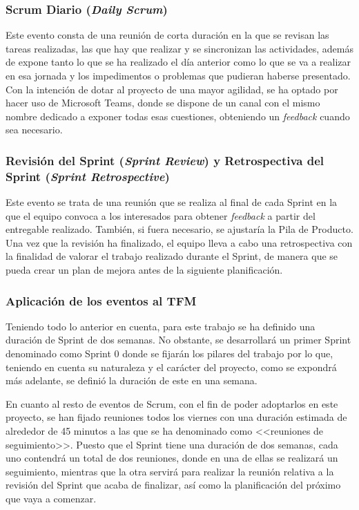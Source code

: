 \subsubsection{Scrum Diario (\textit{Daily Scrum})}
Este evento consta de una reunión de corta duración en la que se revisan las tareas realizadas, las que hay que realizar y se sincronizan las actividades, además de expone tanto lo que se ha realizado el día anterior como lo que se va a realizar en esa jornada y los impedimentos o problemas que pudieran haberse presentado. Con la intención de dotar al proyecto de una mayor agilidad, se ha optado por hacer uso de Microsoft Teams, donde se dispone de un canal con el mismo nombre dedicado a exponer todas esas cuestiones, obteniendo un \textit{feedback} cuando sea necesario.

\subsubsection{Revisión del Sprint (\textit{Sprint Review}) y Retrospectiva del Sprint (\textit{Sprint Retrospective})}
Este evento se trata de una reunión que se realiza al final de cada Sprint en la que el equipo convoca a los interesados para obtener \textit{feedback} a partir del entregable realizado. También, si fuera necesario, se ajustaría la Pila de Producto. Una vez que la revisión ha finalizado, el equipo lleva a cabo una retrospectiva con la finalidad de valorar el trabajo realizado durante el Sprint, de manera que se pueda crear un plan de mejora antes de la siguiente planificación.

\clearpage

\subsubsection{Aplicación de los eventos al \acs{TFM}}
Teniendo todo lo anterior en cuenta, para este trabajo se ha definido una duración de Sprint de dos semanas. No obstante, se desarrollará un primer Sprint denominado como Sprint 0 donde se fijarán los pilares del trabajo por lo que, teniendo en cuenta su naturaleza y el carácter del proyecto, como se expondrá más adelante, se definió la duración de este en una semana.

En cuanto al resto de eventos de Scrum, con el fin de poder adoptarlos en este proyecto, se han fijado reuniones todos los viernes con una duración estimada de alrededor de 45 minutos a las que se ha denominado como <<reuniones de seguimiento>>. Puesto que el Sprint tiene una duración de dos semanas, cada uno contendrá un total de dos reuniones, donde en una de ellas se realizará un seguimiento, mientras que la otra servirá para realizar la reunión relativa a la revisión del Sprint que acaba de finalizar, así como la planificación del próximo que vaya a comenzar.


